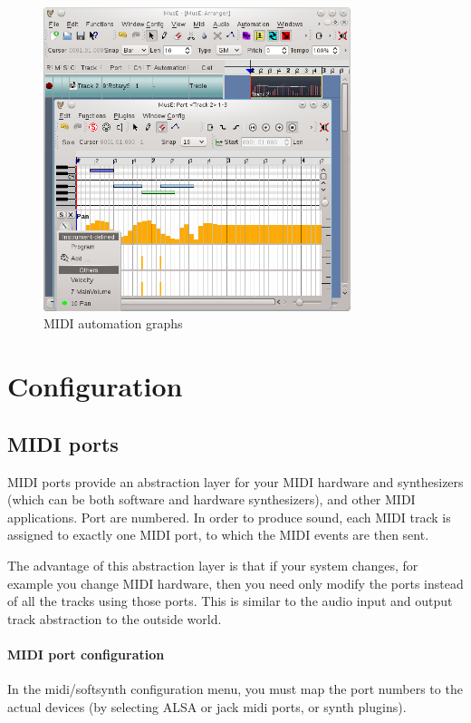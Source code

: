 \documentclass[a4paper]{report}
\newcommand{\screenshotwidth}[0]{0.8\textwidth}
\begin{document}
\begin{figure}[htp]
\centering \includegraphics[width=\screenshotwidth]
{pics/main_window_with_midi_automation}
\caption{MIDI automation graphs}
\label{fig:midi_automation} 
\end{figure}
 

\section{Configuration}

\subsection{MIDI ports} 
MIDI ports provide an abstraction layer for your MIDI hardware and
synthesizers (which can be both software and hardware synthesizers),
and other MIDI applications. Port are numbered. In order to produce
sound, each MIDI track is assigned to exactly one MIDI port, to which
the MIDI events are then sent.

The advantage of this abstraction layer is that if your system changes,
for example you change MIDI hardware, then you need only modify the
ports instead of all the tracks using those ports. This is similar
to the audio input and output track abstraction to the outside world.

\label{midi_port_config} \paragraph{MIDI port configuration} 
In the midi/softsynth configuration menu, you must map the port numbers
to the actual devices (by selecting ALSA or jack midi ports, or synth
plugins).
\end{document}
